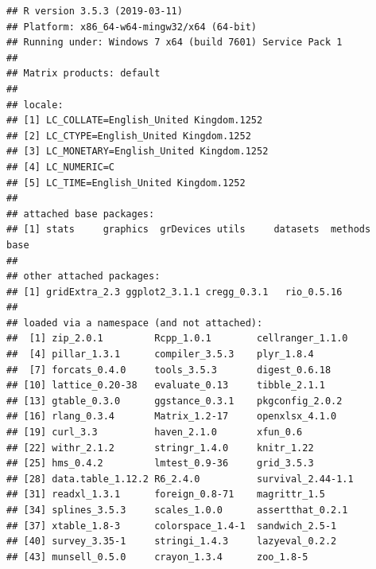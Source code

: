 \documentclass[a4paper,12pt]{article}\usepackage[]{graphicx}\usepackage[]{color}
\makeatletter
\newenvironment{kframe}{%
 \def\at@end@of@kframe{}%
 \ifinner\ifhmode%
  \def\at@end@of@kframe{\end{minipage}}%
  \begin{minipage}{\columnwidth}%
 \fi\fi%
 \def\FrameCommand##1{\hskip\@totalleftmargin \hskip-\fboxsep
 \colorbox{shadecolor}{##1}\hskip-\fboxsep
     \hskip-\linewidth \hskip-\@totalleftmargin \hskip\columnwidth}%
 \MakeFramed {\advance\hsize-\width
   \@totalleftmargin\z@ \linewidth\hsize
   \@setminipage}}%
 {\par\unskip\endMakeFramed%
 \at@end@of@kframe}
\newenvironment{knitrout}{}{} %
\makeatother
\begin{document}
\begin{knitrout}
\color{fgcolor}\begin{kframe}
\begin{verbatim}
## R version 3.5.3 (2019-03-11)
## Platform: x86_64-w64-mingw32/x64 (64-bit)
## Running under: Windows 7 x64 (build 7601) Service Pack 1
## 
## Matrix products: default
## 
## locale:
## [1] LC_COLLATE=English_United Kingdom.1252 
## [2] LC_CTYPE=English_United Kingdom.1252   
## [3] LC_MONETARY=English_United Kingdom.1252
## [4] LC_NUMERIC=C                           
## [5] LC_TIME=English_United Kingdom.1252    
## 
## attached base packages:
## [1] stats     graphics  grDevices utils     datasets  methods   base     
## 
## other attached packages:
## [1] gridExtra_2.3 ggplot2_3.1.1 cregg_0.3.1   rio_0.5.16   
## 
## loaded via a namespace (and not attached):
##  [1] zip_2.0.1         Rcpp_1.0.1        cellranger_1.1.0 
##  [4] pillar_1.3.1      compiler_3.5.3    plyr_1.8.4       
##  [7] forcats_0.4.0     tools_3.5.3       digest_0.6.18    
## [10] lattice_0.20-38   evaluate_0.13     tibble_2.1.1     
## [13] gtable_0.3.0      ggstance_0.3.1    pkgconfig_2.0.2  
## [16] rlang_0.3.4       Matrix_1.2-17     openxlsx_4.1.0   
## [19] curl_3.3          haven_2.1.0       xfun_0.6         
## [22] withr_2.1.2       stringr_1.4.0     knitr_1.22       
## [25] hms_0.4.2         lmtest_0.9-36     grid_3.5.3       
## [28] data.table_1.12.2 R6_2.4.0          survival_2.44-1.1
## [31] readxl_1.3.1      foreign_0.8-71    magrittr_1.5     
## [34] splines_3.5.3     scales_1.0.0      assertthat_0.2.1 
## [37] xtable_1.8-3      colorspace_1.4-1  sandwich_2.5-1   
## [40] survey_3.35-1     stringi_1.4.3     lazyeval_0.2.2   
## [43] munsell_0.5.0     crayon_1.3.4      zoo_1.8-5
\end{verbatim}
\end{kframe}
\end{knitrout}
\end{document}
